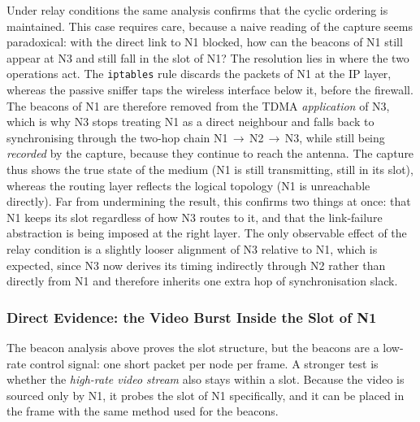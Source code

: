 Under relay conditions the same analysis confirms that the cyclic ordering is
maintained. This case requires care, because a naive reading of the capture
seems paradoxical: with the direct link to N1 blocked, how can the beacons of N1
still appear at N3 and still fall in the slot of N1? The resolution lies in where the
two operations act. The \texttt{iptables} rule discards the packets of N1 at the IP
layer, whereas the passive sniffer taps the wireless interface below it, before
the firewall. The beacons of N1 are therefore removed from the TDMA
\emph{application} of N3, which is why N3 stops treating N1 as a direct neighbour
and falls back to synchronising through the two-hop chain
N1\,$\to$\,N2\,$\to$\,N3, while still being \emph{recorded} by the capture,
because they continue to reach the antenna. The capture thus shows
the true state of the medium (N1 is still transmitting, still in its slot),
whereas the routing layer reflects the logical topology (N1 is unreachable
directly). Far from undermining the result, this confirms two things at once:
that N1 keeps its slot regardless of how N3 routes to it, and that the
link-failure abstraction is being imposed at the right layer. The only
observable effect of the relay condition is a slightly looser alignment of N3
relative to N1, which is expected, since N3 now derives its timing indirectly
through N2 rather than directly from N1 and therefore inherits one extra hop of
synchronisation slack.

\subsubsection{Direct Evidence: the Video Burst Inside the Slot of N1}
\label{subsubsec:video-slot}

The beacon analysis above proves the slot structure, but the beacons are a
low-rate control signal: one short packet per node per frame. A stronger test
is whether the \emph{high-rate video stream} also stays within a slot. Because
the video is sourced only by N1, it probes the slot of N1 specifically, and it can
be placed in the frame with the same method used for the beacons.

